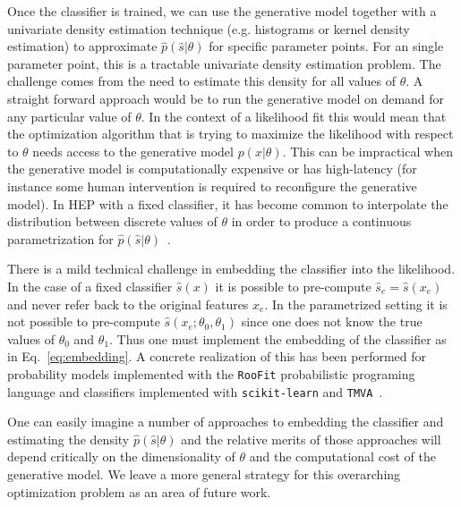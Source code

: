 \documentclass[12pt]{article}
\numberwithin{equation}{section}
\theoremstyle{plain}
\begin{document}
Once the classifier is trained, we can use the generative model together with a
univariate density estimation technique (e.g. histograms or kernel density
estimation) to approximate $\hat{p}(\hat{s}|\theta)$ for specific parameter
points. For an single parameter point, this is a tractable univariate density
estimation problem. The challenge comes from the need to estimate this density
for all values of $\theta$. A straight forward approach would be to run the
generative model on demand for any particular value of $\theta$. In the context
of a likelihood fit this would mean that the optimization algorithm that is
trying to maximize the likelihood with respect to $\theta$ needs access to the
generative model $p(x|\theta)$. This can be  impractical when the generative
model is computationally expensive or has high-latency (for instance some human
intervention is required to reconfigure the generative model).  In  HEP with a
fixed classifier, it has become common  to interpolate the distribution between
discrete values of $\theta$ in order to produce a continuous parametrization for
$\hat p(\hat s | \theta)$~\citep{Cranmer:2012sba}.

There is a mild technical challenge in embedding the classifier into the
likelihood. In the case of a fixed classifier $\hat s(x)$ it is possible to
pre-compute $\hat s_e=\hat s(x_e)$ and never refer back to the original features
$x_e$. In the parametrized setting it is not possible to pre-compute $\hat
s(x_e; \theta_0, \theta_1)$ since one does not know the true values of
$\theta_0$ and $\theta_1$. Thus one must implement the embedding of the
classifier as in Eq.~\ref{eq:embedding}.  A concrete realization of this has
been performed for probability models implemented with the \texttt{RooFit}
probabilistic programing language and  classifiers implemented with
\texttt{scikit-learn} and
\texttt{TMVA}~\citep{Verkerke:2003ir,scikit-learn,Hocker:2007ht}.

One can easily imagine a number of approaches to embedding the classifier and
estimating the density $\hat p(\hat s|\theta)$ and the relative merits of those
approaches will depend critically on the dimensionality of $\theta$ and the
computational cost of the generative model. We leave a more general strategy for
this overarching optimization problem as an area of future work.



\end{document}
